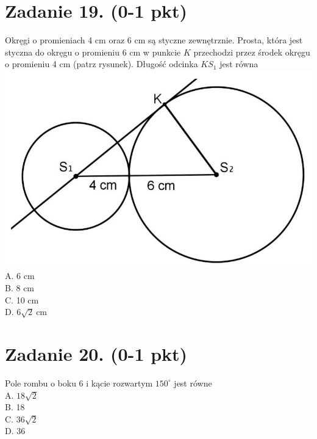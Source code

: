 \documentclass[10pt]{article}
\begin{document}
\section*{Zadanie 19. (0-1 pkt)}
Okręgi o promieniach 4 cm oraz 6 cm są styczne zewnętrznie. Prosta, która jest styczna do okręgu o promieniu 6 cm w punkcie \(K\) przechodzi przez środek okręgu o promieniu 4 cm (patrz rysunek). Długość odcinka \(K S_{1}\) jest równa\\
\includegraphics[max width=\textwidth, center]{2024_11_21_997c30e0b98e62837d84g-08(2)}\\
A. 6 cm\\
B. 8 cm\\
C. 10 cm\\
D. \(6 \sqrt{2} \mathrm{~cm}\)

\section*{Zadanie 20. (0-1 pkt)}
Pole rombu o boku 6 i kącie rozwartym \(150^{\circ}\) jest równe\\
A. \(18 \sqrt{2}\)\\
B. 18\\
C. \(36 \sqrt{2}\)\\
D. 36
\end{document}
